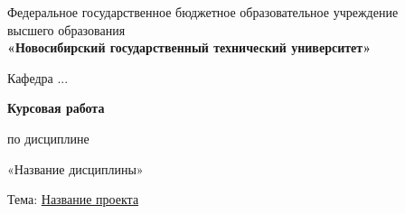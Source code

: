 \providecommand{\ProjectUniversity}{%
Федеральное государственное бюджетное образовательное учреждение\\
высшего образования\\[2pt]
\textbf{«Новосибирский государственный технический университет»}}
\providecommand{\ProjectDepartment}{Кафедра ...}
\providecommand{\ProjectSubject}{Название дисциплины}
\providecommand{\ProjectTheme}{Название проекта}
\providecommand{\ProjectAuthor}{Иванов И.И.}
\providecommand{\ProjectGroup}{РТВ00-00}
\providecommand{\ProjectFaculty}{Факультет ...}
\providecommand{\ProjectChecker}{Преподаватель П.П.}
\providecommand{\ProjectYear}{\the\year}
\providecommand{\ProjectCity}{Новосибирск}

\begin{titlepage}
\begin{center}

\normalsize
\ProjectUniversity

\vspace{6pt}
\ProjectDepartment

\vfill

{\Large\bfseries Курсовая работа}

\vspace{8pt}
по дисциплине

\vspace{4pt}
«\ProjectSubject»

\vspace{12pt}
Тема: \underline{\hspace{2pt}\ProjectTheme\hspace{2pt}}

\vfill

\end{center}


\end{titlepage}
